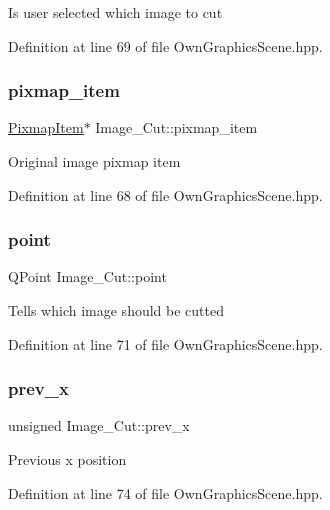 Is user selected which image to cut 

Definition at line 69 of file Own\+Graphics\+Scene.\+hpp.

\mbox{\label{structImage__Cut_afdafc46c968b35b63758d409ef863a8f}} 
\subsubsection{\texorpdfstring{pixmap\+\_\+item}{pixmap\_item}}
{\footnotesize\ttfamily \mbox{\hyperlink{classPixmapItem}{Pixmap\+Item}}$\ast$ Image\+\_\+\+Cut\+::pixmap\+\_\+item}

Original image pixmap item 

Definition at line 68 of file Own\+Graphics\+Scene.\+hpp.

\mbox{\label{structImage__Cut_a45fc996285a5ae8ef255d66655d63df2}} 
\subsubsection{\texorpdfstring{point}{point}}
{\footnotesize\ttfamily Q\+Point Image\+\_\+\+Cut\+::point}

Tells which image should be cutted 

Definition at line 71 of file Own\+Graphics\+Scene.\+hpp.

\mbox{\label{structImage__Cut_a9e6768e7bea9a60876d086d78da3c4df}} 
\subsubsection{\texorpdfstring{prev\+\_\+x}{prev\_x}}
{\footnotesize\ttfamily unsigned Image\+\_\+\+Cut\+::prev\+\_\+x}

Previous x position 

Definition at line 74 of file Own\+Graphics\+Scene.\+hpp.

\mbox{\label{structImage__Cut_ad86dabb21b97270448d8db5aa7a5676f}} 
